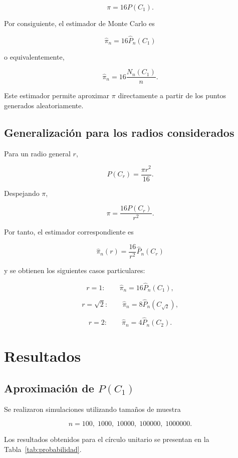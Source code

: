 \documentclass[12pt,a4paper]{article}
\begin{document}
\[
\pi=16P(C_1).
\]

Por consiguiente, el estimador de Monte Carlo es

\[
\boxed{
\widehat{\pi}_n
=
16\widehat{P}_n(C_1)
}
\]

o equivalentemente,

\[
\widehat{\pi}_n
=
16\frac{N_n(C_1)}{n}.
\]

Este estimador permite aproximar \(\pi\) directamente a partir de los
puntos generados aleatoriamente.

\subsection{Generalización para los radios considerados}

Para un radio general \(r\),

\[
P(C_r)=\frac{\pi r^2}{16}.
\]

Despejando \(\pi\),

\[
\pi
=
\frac{16P(C_r)}{r^2}.
\]

Por tanto, el estimador correspondiente es

\[
\boxed{
\widehat{\pi}_n(r)
=
\frac{16}{r^2}
\widehat{P}_n(C_r)
}
\]

y se obtienen los siguientes casos particulares:

\[
r=1:
\qquad
\widehat{\pi}_n
=
16\widehat{P}_n(C_1),
\]

\[
r=\sqrt{2}:
\qquad
\widehat{\pi}_n
=
8\widehat{P}_n(C_{\sqrt{2}}),
\]

\[
r=2:
\qquad
\widehat{\pi}_n
=
4\widehat{P}_n(C_2).
\]


\section{Resultados}

\subsection{Aproximación de \(P(C_1)\)}

Se realizaron simulaciones utilizando tamaños de muestra

\[
n=100,\;1000,\;10000,\;100000,\;1000000.
\]

Los resultados obtenidos para el círculo unitario se presentan en la
Tabla~\ref{tab:probabilidad}.
\end{document}
